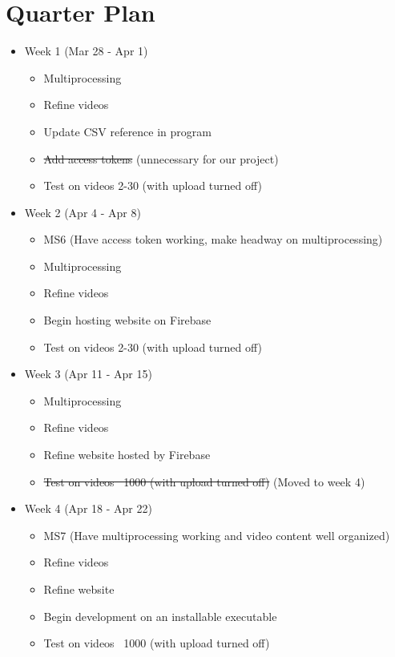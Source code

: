 \documentclass{article}
\begin{document}
\section{Quarter Plan}
\begin{itemize}
    \item Week 1 (Mar 28 - Apr 1)
    \begin{itemize}
        \item Multiprocessing
        \item Refine videos
        \item Update CSV reference in program
        \item \sout{Add access tokens} (unnecessary for our project)
        \item Test on videos 2-30 (with upload turned off)
    \end{itemize}
    \item Week 2 (Apr 4 - Apr 8)
    \begin{itemize}
        \item MS6 (Have access token working, make headway on multiprocessing)
        \item Multiprocessing
        \item Refine videos
        \item Begin hosting website on Firebase
        \item Test on videos 2-30 (with upload turned off)
    \end{itemize}
    \item Week 3 (Apr 11 - Apr 15)
    \begin{itemize}
        \item Multiprocessing
        \item Refine videos
        \item Refine website hosted by Firebase
        \item \sout{Test on videos ~1000 (with upload turned off)} (Moved to week 4)
    \end{itemize}
    \item Week 4 (Apr 18 - Apr 22)
    \begin{itemize}
        \item MS7 (Have multiprocessing working and video content well organized)
        \item Refine videos
        \item Refine website
        \item Begin development on an installable executable
        \item Test on videos ~1000 (with upload turned off)

\end{itemize}
\end{itemize}
\end{document}

